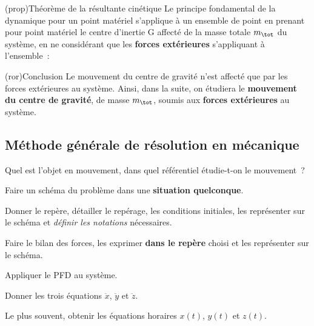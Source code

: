 \documentclass[../../main/main.tex]{subfiles}
\begin{document}
\begin{tcb*}(prop){Théorème de la résultante cinétique}
	Le principe fondamental de la dynamique pour un point matériel s'applique à un
	ensemble de point en prenant pour point matériel le centre d'inertie G affecté
	de la masse totale $m_{\tot}$ du système, en ne considérant que les
	\textbf{forces extérieures} s'appliquant à l'ensemble~: \psw{
		\[\boxed{m_{\tot}\dv{\vf(\Gr)}{t} = \sum \Ff_{\ext}}\]
	}
\end{tcb*}

\begin{tcb*}(ror){Conclusion}
	Le mouvement du centre de gravité n’est affecté que par les forces extérieures
	au système. Ainsi, dans la suite, on étudiera le \textbf{mouvement du centre
		de gravité}, de masse $m_{\tot}$, soumis aux \textbf{forces extérieures} au
	système.
\end{tcb*}

\subsection{Méthode générale de résolution en mécanique}
\begin{enumerate}[label=\sqenumi]
	 Quel est l'objet en mouvement, dans quel
	référentiel étudie-t-on le mouvement~?

	 Faire un schéma du problème dans une \textbf{situation
		quelconque}.

	 Donner le repère, détailler le repérage, les conditions
	initiales, les représenter sur le schéma et \textit{définir les notations}
	nécessaires.

	 Faire le bilan des forces, les exprimer \textbf{dans
		le repère} choisi et les représenter sur le schéma.

	 Appliquer le PFD au système.

	 Donner les trois équations $\ddot{x}$,
	$\ddot{y}$ et $\ddot{z}$.

	 Le plus souvent, obtenir les équations
	horaires $x(t)$, $y(t)$ et $z(t)$.
\end{enumerate}

\end{document}
